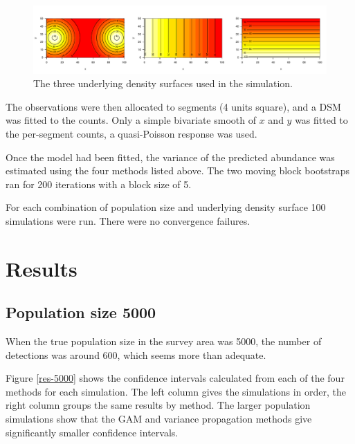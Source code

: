 \documentclass[11pt]{amsart}
\begin{document}
\begin{figure}[htbp]
\begin{center}
\includegraphics[width=\textwidth]{sim-plots}
\caption{The three underlying density surfaces used in the simulation.}
\label{sim-plots}
\end{center}
\end{figure}

The observations were then allocated to segments (4 units square), and a DSM was fitted to the counts. Only a simple bivariate smooth of $x$ and $y$ was fitted to the per-segment counts, a  quasi-Poisson response was used.

Once the model had been fitted, the variance of the predicted abundance was estimated using the four methods listed above. The two moving block bootstraps ran for 200 iterations with a block size of 5.

For each combination of population size and underlying density surface 100 simulations were run. There were no convergence failures.

\section{Results}

\subsection{Population size 5000}

When the true population size in the survey area was 5000, the number of detections was around 600, which seems more than adequate. 

Figure \ref{res-5000} shows the confidence intervals calculated from each of the four methods for each simulation. The left column gives the simulations in order, the right column groups the same results by method. The larger population simulations show that the GAM and variance propagation methods give significantly smaller confidence intervals. 
\end{document}
